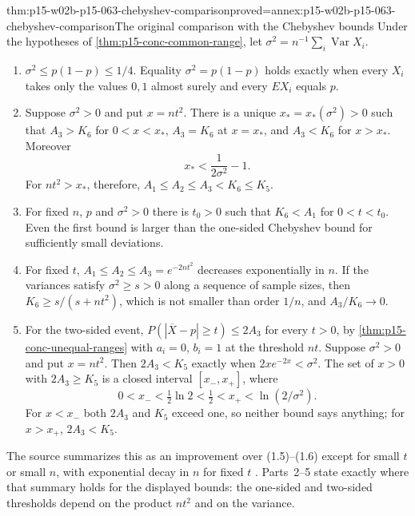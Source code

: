 \begin{hbtheorem}{thm:p15-w02b-p15-063-chebyshev-comparison}{proved=annex:p15-w02b-p15-063-chebyshev-comparison}{The original comparison with the Chebyshev bounds}
Under the hypotheses of \cref{thm:p15-conc-common-range}, let
\(\sigma^2=n^{-1}\sum_i\operatorname{Var}X_i\).
\begin{enumerate}
\item \(\sigma^2\leq p(1-p)\leq1/4\). Equality \(\sigma^2=p(1-p)\) holds
 exactly when every \(X_i\) takes only the values \(0,1\) almost surely and
 every \(EX_i\) equals \(p\).
\item Suppose \(\sigma^2>0\) and put \(x=nt^2\). There is a unique
 \(x_*=x_*(\sigma^2)>0\) such that \(A_3>K_6\) for \(0<x<x_*\),
 \(A_3=K_6\) at \(x=x_*\), and \(A_3<K_6\) for \(x>x_*\). Moreover
 \[
                       x_*<\frac1{2\sigma^2}-1.
 \]
 For \(nt^2>x_*\), therefore, \(A_1\leq A_2\leq A_3<K_6\leq K_5\).
\item For fixed \(n\), \(p\) and \(\sigma^2>0\) there is \(t_0>0\) such
 that \(K_6<A_1\) for \(0<t<t_0\). Even the first bound is larger than
 the one-sided Chebyshev bound for sufficiently small deviations.
\item For fixed \(t\), \(A_1\leq A_2\leq A_3=e^{-2nt^2}\) decreases
 exponentially in \(n\). If the variances satisfy \(\sigma^2\geq s>0\)
 along a sequence of sample sizes, then \(K_6\geq s/(s+nt^2)\), which is
 not smaller than order \(1/n\), and \(A_3/K_6\to0\).
\item For the two-sided event, \(P(|\overline X-p|\geq t)\leq2A_3\) for
 every \(t>0\), by \cref{thm:p15-conc-unequal-ranges} with \(a_i=0\),
 \(b_i=1\) at the threshold \(nt\). Suppose \(\sigma^2>0\) and put
 \(x=nt^2\). Then \(2A_3<K_5\) exactly when \(2xe^{-2x}<\sigma^2\). The
 set of \(x>0\) with \(2A_3\geq K_5\) is a closed interval
 \([x_-,x_+]\), where
 \[
            0<x_-<\tfrac12\ln2<\tfrac12<x_+<\ln(2/\sigma^2).
 \]
 For \(x<x_-\) both \(2A_3\) and \(K_5\) exceed one, so neither bound
 says anything; for \(x>x_+\), \(2A_3<K_5\).
\end{enumerate}
The source summarizes this as an improvement over (1.5)--(1.6) except for
small \(t\) or small \(n\), with exponential decay in \(n\) for fixed
\(t\) \cite[p.~14]{Hoeffding1963BoundedSums}. Parts~2--5 state exactly
where that summary holds for the displayed bounds: the one-sided and
two-sided thresholds depend on the product \(nt^2\) and on the variance.
\end{hbtheorem}

